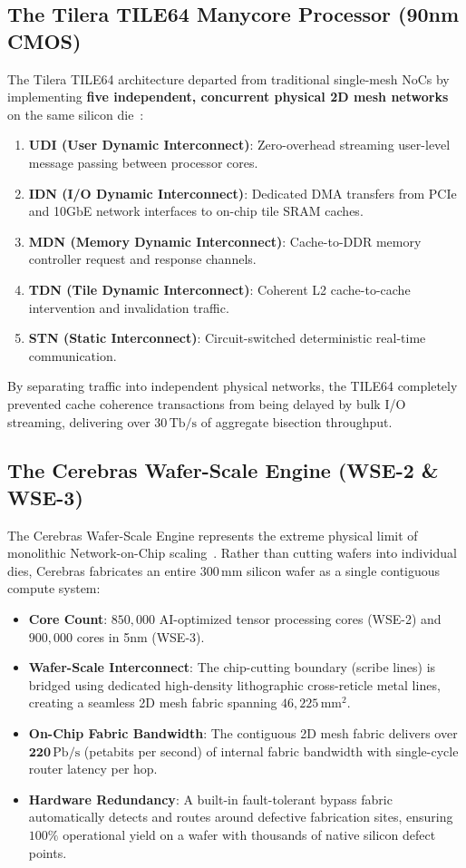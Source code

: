 \subsection{The Tilera TILE64 Manycore Processor (90nm CMOS)}
\label{subsec:ch1_tilera64}

The Tilera TILE64 architecture departed from traditional single-mesh NoCs by implementing \textbf{five independent, concurrent physical 2D mesh networks} on the same silicon die~\cite{Wentzlaff2007}:
\begin{enumerate}
    \item \textbf{UDI (User Dynamic Interconnect)}: Zero-overhead streaming user-level message passing between processor cores.
    \item \textbf{IDN (I/O Dynamic Interconnect)}: Dedicated DMA transfers from PCIe and 10GbE network interfaces to on-chip tile SRAM caches.
    \item \textbf{MDN (Memory Dynamic Interconnect)}: Cache-to-DDR memory controller request and response channels.
    \item \textbf{TDN (Tile Dynamic Interconnect)}: Coherent L2 cache-to-cache intervention and invalidation traffic.
    \item \textbf{STN (Static Interconnect)}: Circuit-switched deterministic real-time communication.
\end{enumerate}
By separating traffic into independent physical networks, the TILE64 completely prevented cache coherence transactions from being delayed by bulk I/O streaming, delivering over $30\,\mathrm{Tb/s}$ of aggregate bisection throughput.

\subsection{The Cerebras Wafer-Scale Engine (WSE-2 \& WSE-3)}
\label{subsec:ch1_cerebras}

The Cerebras Wafer-Scale Engine represents the extreme physical limit of monolithic Network-on-Chip scaling~\cite{Lie2022}. Rather than cutting wafers into individual dies, Cerebras fabricates an entire $300\,\mathrm{mm}$ silicon wafer as a single contiguous compute system:
\begin{itemize}
    \item \textbf{Core Count}: $850,000$ AI-optimized tensor processing cores (WSE-2) and $900,000$ cores in 5nm (WSE-3).
    \item \textbf{Wafer-Scale Interconnect}: The chip-cutting boundary (scribe lines) is bridged using dedicated high-density lithographic cross-reticle metal lines, creating a seamless 2D mesh fabric spanning $46,225\,\mathrm{mm^2}$.
    \item \textbf{On-Chip Fabric Bandwidth}: The contiguous 2D mesh fabric delivers over $\mathbf{220\,\mathrm{Pb/s}}$ (petabits per second) of internal fabric bandwidth with single-cycle router latency per hop.
    \item \textbf{Hardware Redundancy}: A built-in fault-tolerant bypass fabric automatically detects and routes around defective fabrication sites, ensuring $100\%$ operational yield on a wafer with thousands of native silicon defect points.
\end{itemize}

